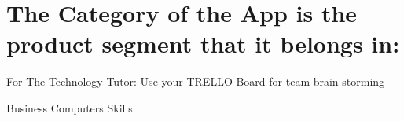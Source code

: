 \section{The Category of the App is the product segment that it belongs in:}

For The Technology Tutor:
Use your TRELLO Board for team brain storming

Business Computers Skills